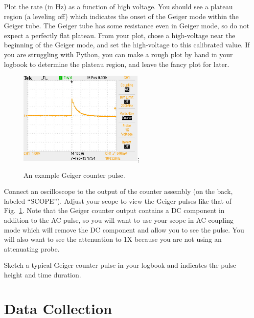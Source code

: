\begin{plot}
Plot the rate (in Hz) as a function of high voltage.  You should see a
plateau region (a leveling off) which indicates the onset of the
Geiger mode within the Geiger tube.  The Geiger tube has some
resistance even in Geiger mode, so do not expect a perfectly flat
plateau.  From your plot, chose a high-voltage near the beginning of
the Geiger mode, and set the high-voltage to this calibrated value.
If you are struggling with Python, you can make a rough plot by hand
in your logbook to determine the plateau region, and leave the fancy
plot for later.
\end{plot}

\begin{figure}[htbp]
\begin{center}
 \includegraphics[width=0.55\textwidth]{figs/labs/geiger/pulse.jpg};
\caption{\label{fig:geigerpulse} An example Geiger counter pulse.}
\end{center}
\end{figure}

Connect an oscilloscope to the output of the counter assembly (on the
back, labeled ``SCOPE'').  Adjust your scope to view the Geiger pulses
like that of Fig.~\ref{fig:geigerpulse}.  Note that the Geiger counter
output contains a DC component in addition to the AC pulse, so you
will want to use your scope in AC coupling mode which will remove the
DC component and allow you to see the pulse.  You will also want to
see the attenuation to 1X because you are not using an attenuating
probe.

\begin{measurement}
Sketch a typical Geiger counter pulse in your logbook and indicates the pulse height and time duration.
\end{measurement}

\section{Data Collection}

